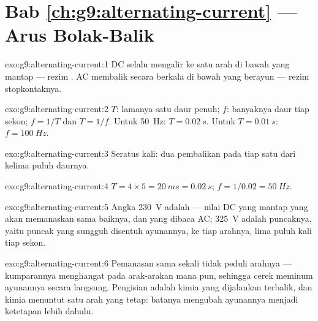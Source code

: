 \section*{Bab \ref{ch:g9:alternating-current} --- Arus Bolak-Balik}

\begin{solution}{exo:g9:alternating-current:1}
DC selalu mengalir ke satu arah di bawah  yang mantap ---
rezim . AC membalik secara berkala di bawah  yang
berayun --- rezim stopkontaknya.
\end{solution}

\begin{solution}{exo:g9:alternating-current:2}
$T$: lamanya satu daur penuh; $f$: banyaknya daur tiap sekon;
$f = 1/T$ dan $T = 1/f$. Untuk \qty{50}{Hz}: $T =
\qty{0.02}{s}$. Untuk $T = \qty{0.01}{s}$: $f = \qty{100}{Hz}$.
\end{solution}

\begin{solution}{exo:g9:alternating-current:3}
Seratus kali: dua pembalikan pada tiap satu dari kelima puluh daurnya.
\end{solution}

\begin{solution}{exo:g9:alternating-current:4}
$T = 4 \times 5 = \qty{20}{ms} = \qty{0.02}{s}$; $f = 1/0.02
= \qty{50}{Hz}$.
\end{solution}

\begin{solution}{exo:g9:alternating-current:5}
Angka \qty{230}{V} adalah  --- nilai DC yang mantap
yang akan memanaskan sama baiknya, dan yang dibaca  AC;
\qty{325}{V} adalah puncaknya, yaitu puncak yang sungguh disentuh
ayunannya, ke tiap arahnya, lima puluh kali tiap sekon.
\end{solution}

\begin{solution}{exo:g9:alternating-current:6}
Pemanasan sama sekali tidak peduli arahnya --- kumparannya menghangat
pada arak-arakan mana pun, sehingga cerek meminum ayunannya secara
langsung. Pengisian adalah kimia yang dijalankan terbalik, dan kimia
menuntut satu arah yang tetap: batanya mengubah ayunannya menjadi
ketetapan lebih dahulu.
\end{solution}

